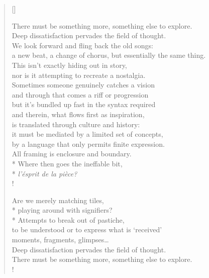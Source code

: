 
\prelude

\settowidth{\versewidth}{a new beat, a change of chorus, but essentially the same thing.}

\begin{verse}[\versewidth]

There must be something more, something else to explore.\\
Deep dissatisfaction pervades the field of thought.\\
We look forward and fling back the old songs:\\
a new beat, a change of chorus, but essentially the same thing.\\
This isn't exactly hiding out in story,\\
nor is it attempting to recreate a nostalgia.\\
Sometimes someone genuinely catches a vision\\
and through that comes a riff or progression\\ %
but it's bundled up fast in the syntax required\\
and therein, what flows first as inspiration,\\
is translated through culture and history:\\
it must be mediated by a limited set of concepts,\\
by a language that only permits finite expression.\\
All framing is enclosure and boundary.\\*
Where then goes the ineffable bit,\\*
\textit{l'\'esprit de la pièce?}\\!

Are we merely matching tiles,\\*
playing around with signifiers?\\*
Attempts to break out of pastiche,\\
to be understood or to express what is `received'\=\\
moments, fragments, glimpses\ldots\\
Deep dissatisfaction pervades the field of thought.\\
There must be something more, something else to explore.\\!

\end{verse}

